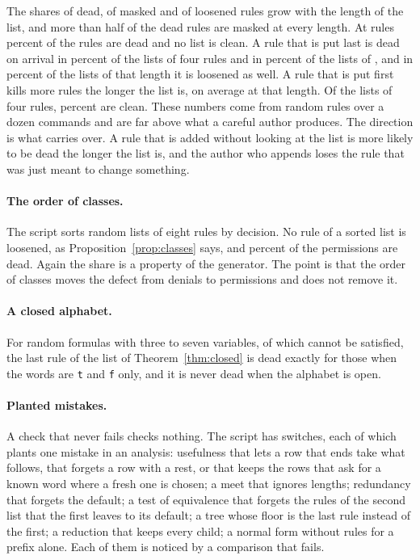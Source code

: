 \documentclass[acmsmall,nonacm,screen]{acmart}
\newcommand{\claim}[2]{#2}
\begin{document}
\claim{growth}{The shares of dead, of masked and of loosened rules grow with the length of
the list, and more than half of the dead rules are masked at every length. At
\exGrowthLargest{} rules \exGrowthDead{} percent of the rules are dead and no list is clean.
A rule that is put last is dead on arrival in \exGrowthArrivalSmall{} percent of the lists of
four rules and in \exGrowthArrival{} percent of the lists of \exGrowthLargest{}, and in
\exGrowthArrivalLoose{} percent of the lists of that length it is loosened as well. A rule that is put first kills more
rules the longer the list is, \exGrowthKilled{} on average at that length.} Of the lists of
four rules, \exGrowthSmallClean{} percent are clean. These numbers come from random rules
over a dozen commands and are far above what a careful author produces. The direction is
what carries over. A rule that is added without looking at the list is more likely to be dead
the longer the list is, and the author who appends loses the rule that was just meant to
change something.

\paragraph{The order of classes.} \claim{classes}{The script sorts \exClassLists{} random
lists of eight rules by decision. No rule of a sorted list is loosened, as
Proposition~\ref{prop:classes} says, and \exClassNever{} percent of the permissions are
dead.} Again the share is a property of the generator. The point is that the order of classes
moves the defect from denials to permissions and does not remove it.

\paragraph{A closed alphabet.} \claim{closed}{For \exFormulas{} random formulas with three
to seven variables, of which \exUnsat{} cannot be satisfied, the last rule of the list of
Theorem~\ref{thm:closed} is dead exactly for those when the words are \texttt{t} and
\texttt{f} only, and it is never dead when the alphabet is open.}

\paragraph{Planted mistakes.} A check that never fails checks nothing. The script has
\exMutants{} switches, each of which plants one mistake in an analysis: usefulness that lets
a row that ends take what follows, that forgets a row with a rest, or that keeps the rows
that ask for a known word where a fresh one is chosen; a meet that ignores lengths;
redundancy that forgets the default; a test of equivalence that forgets the rules of the
second list that the first leaves to its default; a tree whose floor is the last rule instead
of the first; a reduction that keeps every child; a normal form without rules for a prefix
alone. \claim{all-noticed}{Each of them is noticed by a comparison that fails.}
\end{document}
